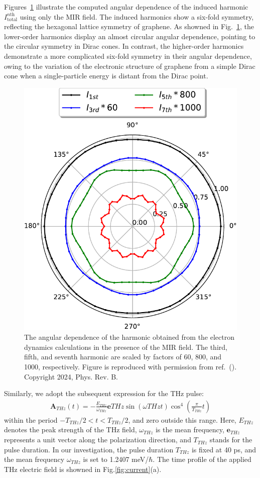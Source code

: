 Figures~\ref{fig:SI_polar_mir} illustrate the computed angular dependence of the induced harmonic  $I^{n \textrm{th}}_{\mathrm{total}}$ using only the MIR field. The induced harmonics show a six-fold symmetry, reflecting the hexagonal lattice symmetry of graphene. As showned in Fig.~\ref{fig:SI_polar_mir}, the lower-order harmonics display an almost circular angular dependence, pointing to the circular symmetry in Dirac cones. In contrast, the higher-order harmonics demonstrate a more complicated six-fold symmetry in their angular dependence, owing to the variation of the electronic structure of graphene from a simple Dirac cone when a single-particle energy is distant from the Dirac point.
\begin{figure}[tb]
	\centering
	\includegraphics[width=0.50\linewidth]{pic/polar_mir.pdf}
	\caption{\label{fig:SI_polar_mir}
		The angular dependence of the harmonic  obtained from the electron dynamics calculations in the presence of the MIR field. The third, fifth, and seventh harmonic are scaled by factors of 60, 800, and 1000, respectively. Figure is reproduced with permission from ref.~(\cite{PhysRevB.109.045421}). Copyright 2024, Phys. Rev. B.
	}
\end{figure}
Similarly, we adopt the subsequent expression for the THz pulse:
\begin{align}
	\mathbf A_{THz}(t) = -\frac{E_{THz}}{\omega_{THz}} \mathbf{e}{THz}
	\sin(\omega{THz} t) \cos^4 \left (\frac{\pi}{T_{THz}} t \right)
	\label{eqn:laser_pulse}
\end{align}
within the period $-T_{THz}/2 < t < T_{THz}/2$, and zero outside this range. Here, $E_{THz}$ denotes the peak strength of the THz field, $\omega_{THz}$ is the mean frequency, $\mathbf e_{THz}$ represents a unit vector along the polarization direction, and $T_{THz}$ stands for the pulse duration. In our investigation, the pulse duration $T_{THz}$ is fixed at 40 ps, and the mean frequency $\omega_{THz}$ is set to 1.2407 meV/$\hbar$. The time profile of the applied THz electric field is showned in Fig.\ref{fig:current}(a).

